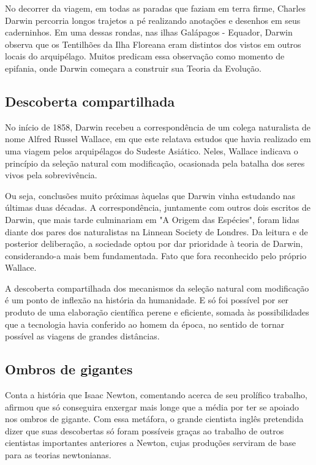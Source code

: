 \documentclass[12pt]{extarticle}
\begin{document}
No decorrer da viagem, em todas as paradas que faziam em terra firme,
Charles Darwin percorria longos trajetos a pé realizando anotações e
desenhos em seus caderninhos. Em uma dessas rondas, nas ilhas Galápagos
- Equador, Darwin observa que os Tentilhões da Ilha Floreana eram
distintos dos vistos em outros locais do arquipélago. Muitos predicam
essa observação como momento de epifania, onde Darwin começara a
construir sua Teoria da Evolução.

\subsection{Descoberta compartilhada}

No início de 1858, Darwin recebeu a correspondência de um colega
naturalista de nome Alfred Russel Wallace, em que este relatava estudos
que havia realizado em uma viagem pelos arquipélagos do Sudeste
Asiático. Neles, Wallace indicava o princípio da seleção natural com
modificação, ocasionada pela batalha dos seres vivos pela sobrevivência.

Ou seja, conclusões muito próximas àquelas que Darwin vinha estudando
nas últimas duas décadas. A correspondência, juntamente com outros dois
escritos de Darwin, que mais tarde culminariam em "A Origem das
Espécies", foram lidas diante dos pares dos naturalistas na Linnean
Society de Londres. Da leitura e de posterior deliberação, a sociedade
optou por dar prioridade à teoria de Darwin, considerando-a mais bem
fundamentada. Fato que fora reconhecido pelo próprio Wallace.

A descoberta compartilhada dos mecanismos da seleção natural com
modificação é um ponto de inflexão na história da humanidade. E só foi
possível por ser produto de uma elaboração científica perene e
eficiente, somada às possibilidades que a tecnologia havia conferido ao
homem da época, no sentido de tornar possível as viagens de grandes
distâncias.


\subsection{Ombros de gigantes}

Conta a história que Isaac Newton, comentando acerca de seu prolífico
trabalho, afirmou que só conseguira enxergar mais longe que a média por
ter se apoiado nos ombros de gigante. Com essa metáfora, o grande
cientista inglês pretendida dizer que suas descobertas só foram
possíveis graças ao trabalho de outros cientistas importantes anteriores
a Newton, cujas produções serviram de base para as teorias newtonianas.
\end{document}
